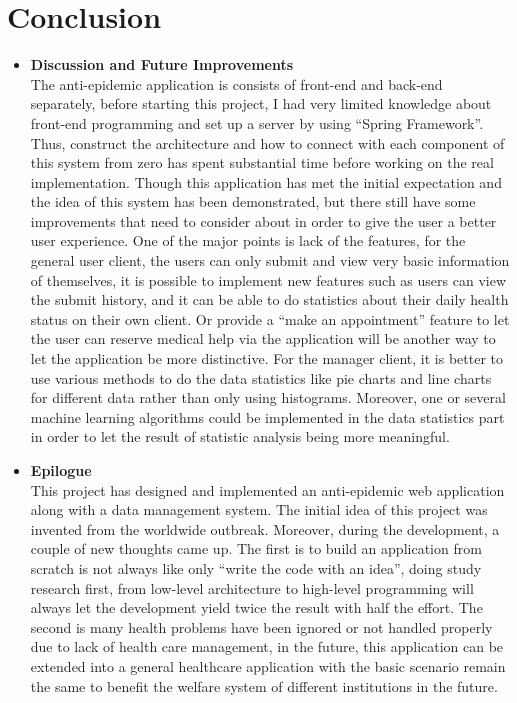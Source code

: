 \documentclass[12pt]{article}
\begin{document}
\section{Conclusion}
\begin{itemize}
\item\textbf{Discussion and Future Improvements}
\\The anti-epidemic application is consists of front-end and back-end separately, before starting this project, I had very limited knowledge about front-end programming and set up a server by using ``Spring Framework''. Thus, construct the architecture and how to connect with each component of this system from zero has spent substantial time before working on the real implementation. Though this application has met the initial expectation and the idea of this system has been demonstrated, but there still have some improvements that need to consider about in order to give the user a better user experience. One of the major points is lack of the features, for the general user client, the users can only submit and view very basic information of themselves, it is possible to implement new features such as users can view the submit history, and it can be able to do statistics about their daily health status on their own client. Or provide a ``make an appointment'' feature to let the user can reserve medical help via the application will be another way to let the application be more distinctive. For the manager client, it is better to use various methods to do the data statistics like pie charts and line charts for different data rather than only using histograms. Moreover, one or several machine learning algorithms could be implemented in the data statistics part in order to let the result of statistic analysis being more meaningful. 
\item\textbf{Epilogue}
\\This project has designed and implemented an anti-epidemic web application along with a data management system. The initial idea of this project was invented from the worldwide outbreak. Moreover, during the development, a couple of new thoughts came up. The first is to build an application from scratch is not always like only ``write the code with an idea'', doing study research first, from low-level architecture to high-level programming will always let the development yield twice the result with half the effort. The second is many health problems have been ignored or not handled properly due to lack of health care management, in the future, this application can be extended into a general healthcare application with the basic scenario remain the same to benefit the welfare system of different institutions in the future.
\end{itemize}
\newpage
{}


\newpage
\addappheadtotoc
\end{document}
